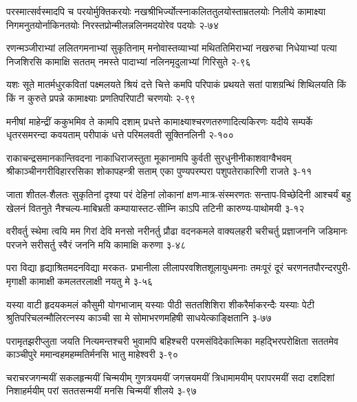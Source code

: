 \annofourlineindentedshloka
{परस्मात्सर्वस्मादपि च परयोर्मुक्तिकरयोः}
{नखश्रीभिर्ज्योत्स्नाकलिततुलयोस्ताम्रतलयोः}
{निलीये कामाक्ष्या निगमनुतयोर्नाकिनतयोः}
{निरस्तप्रोन्मीलन्नलिनमदयोरेव पदयोः}
{२-७४}

\annofourlineindentedshloka
{रणन्मञ्जीराभ्यां ललितगमनाभ्यां सुकृतिनाम्}
{मनोवास्तव्याभ्यां मथिततिमिराभ्यां नखरुचा}
{निधेयाभ्यां पत्या निजशिरसि कामाक्षि सततम्}
{नमस्ते पादाभ्यां नलिनमृदुलाभ्यां गिरिसुते}
{२-९६}

\annofourlineindentedshloka
{यशः सूते मातर्मधुरकवितां पक्ष्मलयते}
{श्रियं दत्ते चित्ते कमपि परिपाकं प्रथयते}
{सतां पाशग्रन्थिं शिथिलयति किं किं न कुरुते}
{प्रपन्ने कामाक्ष्याः प्रणतिपरिपाटी चरणयोः}
{२-९९}


\annofourlineindentedshloka
{मनीषां माहेन्द्रीं ककुभमिव ते कामपि दशाम्}
{प्रधत्ते कामाक्ष्याश्चरणतरुणादित्यकिरणः}
{यदीये सम्पर्के धृतरसमरन्दा कवयताम्}
{परीपाकं धत्ते परिमलवती सूक्तिनलिनी}
{२-१००}

\annofourlineindentedshloka
{राकाचन्द्रसमानकान्तिवदना नाकाधिराजस्तुता}
{मूकानामपि कुर्वती सुरधुनीनीकाशवाग्वैभवम्}
{श्रीकाञ्चीनगरीविहाररसिका शोकापहन्त्री सताम्}
{एका पुण्यपरम्परा पशुपतेराकारिणी राजते}
{३-११}

\annofourlineindentedshloka
{जाता शीतल-शैलतः सुकृतिनां दृश्या परं देहिनां}
{लोकानां क्षण-मात्र-संस्मरणतः सन्ताप-विच्छेदिनी}
{आश्चर्यं बहु खेलनं वितनुते नैश्चल्य-माबिभ्रती}
{कम्पायास्तट-सीम्नि काऽपि तटिनी कारुण्य-पाथोमयी}
{३-१२}

\annofourlineindentedshloka
{वरीवर्तु स्थेमा त्वयि मम गिरां देवि मनसो}
{नरीनर्तु प्रौढा वदनकमले वाक्यलहरी}
{चरीचर्तु प्रज्ञाजननि जडिमानः परजने}
{सरीसर्तु स्वैरं जननि मयि कामाक्षि करुणा}
{३-४८}

\annofourlineindentedshloka
{परा विद्या हृद्याश्रितमदनविद्या मरकत-}
{प्रभानीला लीलापरवशितशूलायुधमनाः}
{तमःपूरं दूरं चरणनतपौरन्दरपुरी-}
{मृगाक्षी कामाक्षी कमलतरलाक्षी नयतु मे}
{३-५६}

\annofourlineindentedshloka
{यस्या वाटी हृदयकमलं कौसुमी योगभाजाम्}
{यस्याः पीठी सततशिशिरा शीकरैर्माकरन्दैः}
{यस्याः पेटी श्रुतिपरिचलन्मौलिरत्नस्य काञ्ची}
{सा मे सोमाभरणमहिषी साधयेत्काङ्क्षितानि}
{३-७७}

\annofourlineindentedshloka
{परामृतझरीप्लुता जयति नित्यमन्तश्चरी}
{भुवामपि बहिश्चरी परमसंविदेकात्मिका}
{महद्भिरपरोक्षिता सततमेव काञ्चीपुरे}
{ममान्वहमहम्मतिर्मनसि भातु माहेश्वरी}
{३-९०}

\annofourlineindentedshloka
{चराचरजगन्मयीं सकलहृन्मयीं चिन्मयीम्}
{गुणत्रयमयीं जगत्त्रयमयीं त्रिधामामयीम्}
{परापरमयीं सदा दशदिशां निशाहर्मयीम्}
{परां सततसन्मयीं मनसि चिन्मयीं शीलये}
{३-९७}

